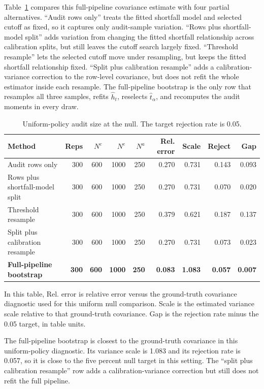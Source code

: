 \documentclass[11pt]{article}
\begin{document}
Table~\ref{tab-audit-method} compares this full-pipeline covariance estimate
with four partial alternatives.  ``Audit rows only'' treats the fitted
shortfall model and selected cutoff as fixed, so it captures only audit-sample
variation.  ``Rows plus shortfall-model split'' adds variation from changing
the fitted shortfall relationship across calibration splits, but still leaves
the cutoff search largely fixed.  ``Threshold resample'' lets the selected
cutoff move under resampling, but keeps the fitted shortfall relationship fixed.
``Split plus calibration resample'' adds a calibration-variance correction to
the row-level covariance, but does not refit the whole estimator inside each
resample.  The full-pipeline bootstrap is the only row that resamples all three
samples, refits \(\hat h_t\), reselects \(\hat t_\alpha\), and recomputes the
audit moments in every draw.

\begin{table}[htbp]
\centering
\scriptsize
\begin{tabular}{@{}lrrrrrrrr@{}}
\toprule
Method & Reps & \(N^c\) & \(N^e\) & \(N^a\) & Rel. error & Scale & Reject & Gap \\
\midrule
Audit rows only & 300 & 600 & 1000 & 250 & 0.270 & 0.731 & 0.143 & 0.093 \\
Rows plus shortfall-model split & 300 & 600 & 1000 & 250 & 0.270 & 0.731 & 0.070 & 0.020 \\
Threshold resample & 300 & 600 & 1000 & 250 & 0.379 & 0.621 & 0.187 & 0.137 \\
Split plus calibration resample & 300 & 600 & 1000 & 250 & 0.270 & 0.731 & 0.073 & 0.023 \\
\textbf{Full-pipeline bootstrap} & \textbf{300} & \textbf{600} & \textbf{1000} & \textbf{250} & \textbf{0.083} & \textbf{1.083} & \textbf{0.057} & \textbf{0.007} \\
\bottomrule
\end{tabular}
\caption{Uniform-policy audit size at the null.  The target rejection rate is 0.05.}
\label{tab-audit-method}
\end{table}

In this table, Rel. error is relative error versus the ground-truth covariance
diagnostic used for this uniform null comparison.  Scale is the estimated
variance scale relative to that ground-truth covariance.  Gap is the rejection
rate minus the 0.05 target, in table units.

The full-pipeline bootstrap is closest to the ground-truth covariance in this
uniform-policy diagnostic.  Its variance scale is 1.083 and its rejection rate
is 0.057, so it is close to the five percent null target in this setting.  The
``split plus calibration resample'' row adds a calibration-variance correction
but still does not refit the full pipeline.
\end{document}
